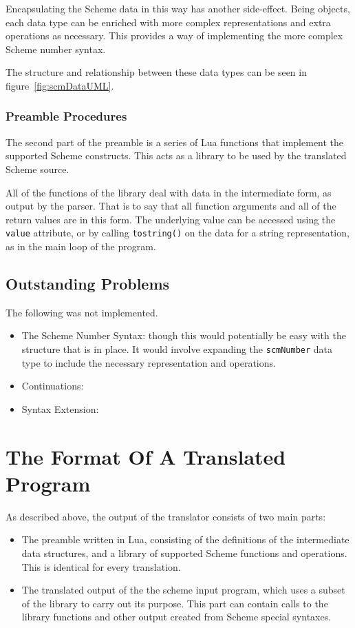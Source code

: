 Encapsulating the Scheme data in this way has another side-effect. Being
objects, each data type can be enriched with more complex representations and
extra operations as necessary. This provides a way of implementing the more
complex Scheme number syntax.

The structure and relationship between these data types
can be seen in figure~\ref{fig:scmDataUML}.

\subsubsection{Preamble Procedures}

The second part of the preamble is a series of Lua functions that implement the
supported Scheme constructs. This acts as a library to be used by the
translated Scheme source.

All of the functions of the library deal with data in the intermediate form, as
output by the parser. That is to say that all function arguments and all of the
return values are in this form. The underlying value can be accessed using the
\texttt{value} attribute, or by calling \texttt{tostring()} on the data for a
string representation, as in the main loop of the program.

\subsection{Outstanding Problems}

The following was not implemented.
\begin{itemize}
\item The Scheme Number Syntax: though this would potentially be easy with the
structure that is in place. It would involve expanding the \texttt{scmNumber}
data type to include the necessary representation and operations.
\item Continuations: 
\item Syntax Extension:
\end{itemize}

\section{The Format Of A Translated Program}

As described above, the output of the translator consists of two main parts:
\begin{itemize}
\item The preamble written in Lua, consisting of the definitions of the
intermediate data structures, and a library of supported Scheme functions and
operations.  This is identical for every translation.
\item The translated output of the the scheme input program, which uses a subset
of the library to carry out its purpose. This part can contain calls to the
library functions and other output created from Scheme special syntaxes.
\end{itemize}

